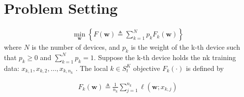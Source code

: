 

\section{Problem Setting}

\begin{align}
	\min _{\mathbf{w}}\left\{F(\mathbf{w}) \triangleq \sum_{k=1}^{N} p_{k} F_{k}(\mathbf{w})\right\}
	\label{eq:problem}
\end{align}
where $N$ is the number of devices, and $p_k$ is the weight of the k-th device
such that $p_k \geq 0$ and $\sum_{k=1}^N p_k = 1$. Suppose the k-th device
holds the nk training data: $x_{k,1}, x_{k,2}, \dots, x_{k,n_k}$ . The local
$k \in S_t^K$ objective $F_k(\cdot)$ is defined by

\begin{align}
F_{k}(\mathbf{w}) \triangleq \frac{1}{n_{k}} \sum_{j=1}^{n_{k}} \ell\left(\mathbf{w} ; x_{k, j}\right)	
\label{eq:localloss}
\end{align}





